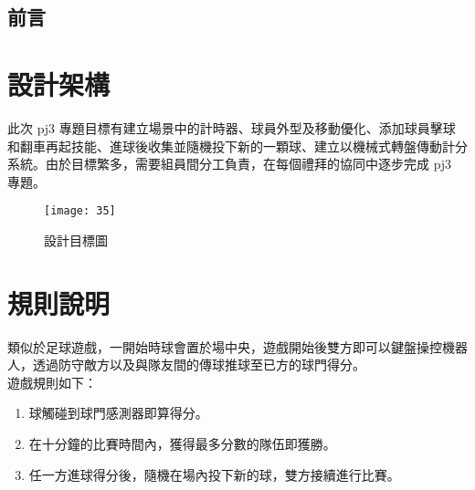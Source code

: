 \subsection{前言}
\renewcommand{\baselinestretch}{10.0} %
\setcounter{page}{1}  %
\fontsize{14pt}{2.5pt}\sectionef
\section{設計架構}
此次 pj3 專題目標有建立場景中的計時器、球員外型及移動優化、添加球員擊球和翻車再起技能、進球後收集並隨機投下新的一顆球、建立以機械式轉盤傳動計分系統。由於目標繁多，需要組員間分工負責，在每個禮拜的協同中逐步完成 pj3 專題。\\

\begin{figure}[hbt!]
\begin{center}
\texttt{[image: 35]}
\caption{\Large 設計目標圖}\label{fig.35}
\end{center}
\end{figure}
\section{規則說明}\emph{}
類似於足球遊戲，一開始時球會置於場中央，遊戲開始後雙方即可以鍵盤操控機器人，透過防守敵方以及與隊友間的傳球推球至已方的球門得分。\\
遊戲規則如下：
\begin{enumerate}
\item 球觸碰到球門感測器即算得分。
\item 在十分鐘的比賽時間內，獲得最多分數的隊伍即獲勝。
\item 任一方進球得分後，隨機在場內投下新的球，雙方接續進行比賽。
\end{enumerate}

\renewcommand{\baselinestretch}{0.5} %
